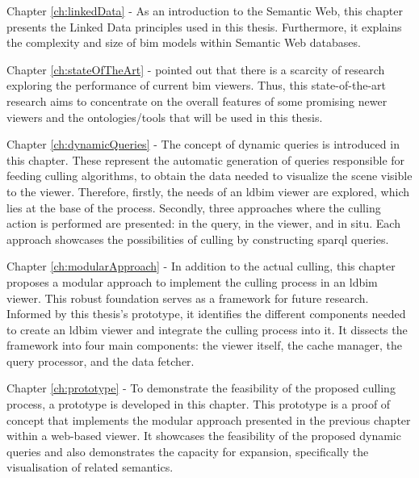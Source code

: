 \begin{refsection}
\begin{multicols}{2}
        \textsf{Chapter \ref{ch:linkedData} -}
        As an introduction to the Semantic Web, this chapter presents the Linked Data principles used in this thesis. Furthermore, it explains the complexity and size of \ac{bim} models within Semantic Web databases.

        \textsf{Chapter \ref{ch:stateOfTheArt} -}
        \cite{Johansson2015} pointed out that there is a scarcity of research exploring the performance of current \ac{bim} viewers. Thus, this state-of-the-art research aims to concentrate on the overall features of some promising newer viewers and the ontologies/tools that will be used in this thesis.

        \textsf{Chapter \ref{ch:dynamicQueries} -}
        The concept of dynamic queries is introduced in this chapter. These represent the automatic generation of queries responsible for feeding culling algorithms, to obtain the data needed to visualize the scene visible to the viewer. Therefore, firstly, the needs of an \ac{ldbim} viewer are explored, which lies at the base of the process. Secondly, three approaches where the culling action is performed are presented: in the query, in the viewer, and in situ. Each approach showcases the possibilities of culling by constructing \ac{sparql} queries.

        \textsf{Chapter \ref{ch:modularApproach} -}
        In addition to the actual culling, this chapter proposes a modular approach to implement the culling process in an \ac{ldbim} viewer. This robust foundation serves as a framework for future research. Informed by this thesis's prototype, it identifies the different components needed to create an \ac{ldbim} viewer and integrate the culling process into it. It dissects the framework into four main components: the viewer itself, the cache manager, the query processor, and the data fetcher.

        \textsf{Chapter \ref{ch:prototype} -}
        To demonstrate the feasibility of the proposed culling process, a prototype is developed in this chapter. This prototype is a proof of concept that implements the modular approach presented in the previous chapter within a web-based viewer. It showcases the feasibility of the proposed dynamic queries and also demonstrates the capacity for expansion, specifically the visualisation of related semantics.


\end{multicols}
\end{refsection}
